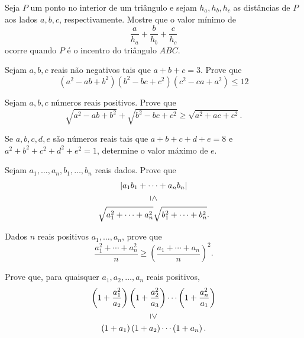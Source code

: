 \documentclass[10pt,a4paper]{article}
\begin{document}
	\begin{prob}
		Seja $P$ um ponto no interior de um triângulo e sejam $h_a, h_b, h_c$ as distâncias de $P$ aos lados $a, b, c$, respectivamente. Mostre que o valor mínimo de  \[
			\frac{a}{h_a} + \frac{b}{h_b} + \frac{c}{h_c} 
		\]
			ocorre quando $P$ é o incentro do triângulo $ABC$.
	\end{prob}

	\begin{prob}
		Sejam $a, b, c$ reais não negativos tais que $a + b + c = 3$. Prove que  \[
			\left(a^2 - ab + b^2\right)
			\left(b^2 - bc + c^2\right)
			\left(c^2 - ca + a^2\right)
			\le 12
		\]
	\end{prob}

	\begin{prob}
		Sejam $a, b, c$ números reais positivos. Prove que \[
			\sqrt{a^2 - ab + b^2} + \sqrt{b^2 - bc + c^2} \ge \sqrt{a^2 + ac + c^2}.
		\]
	\end{prob}

	\begin{prob}
		Se $a, b, c, d, e$ são números reais tais que $a + b + c + d + e = 8$ e $a^2 + b^2 + c^2 + d^2 + e^2 = 1$, determine o valor máximo de $e$.
	\end{prob}


	\begin{prob}
		Sejam $a_1, \dots, a_n, b_1, \dots, b_n$ reais dados. Prove que \begin{gather*}
			\left|a_1b_1 + \cdots + a_nb_n\right| \\
			\rotatebox[origin=c]{270}{$\le$} \\
			\sqrt{a_1^2 + \cdots + a_n^2} \sqrt{b_1^2 + \cdots + b_n^2}.
		\end{gather*}
	\end{prob}

	\begin{prob}
		Dados $n$ reais positivos $a_1, \dots, a_n$, prove que \[
			\frac{a_1^2 + \cdots + a_n^2}{n} \ge \left(\frac{a_1 + \cdots + a_n}{n}\right)^2.
		\]
	\end{prob}

	
	\begin{prob}%
		Prove que, para quaisquer $a_1, a_2, \dots, a_n$ reais positivos,
		\begin{gather*}
			\left(1 + \frac{a_1^2}{a_2}\right)
			\left(1 + \frac{a_2^2}{a_3}\right) \cdots
			\left(1 + \frac{a_n^2}{a_1}\right) \\
			\rotatebox[origin=c]{270}{$\ge$} \\
			\left(1 + a_1\right)
			\left(1 + a_2\right) \cdots
			\left(1 + a_n\right).
		\end{gather*}
	\end{prob}
	
\end{document}
